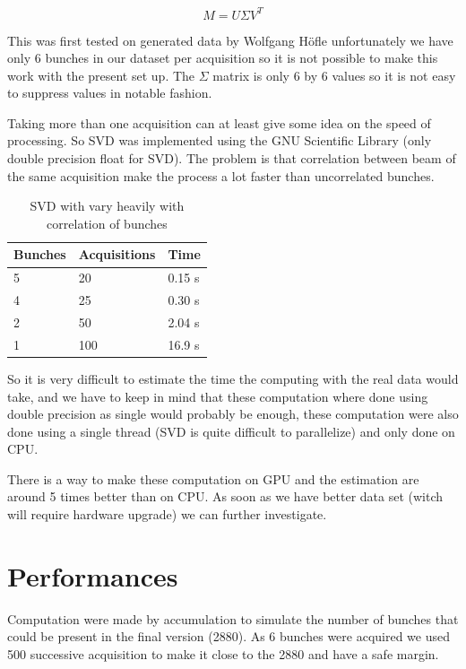 $$M = U \Sigma V^{T}$$ 

This was first tested on generated data by Wolfgang H{\"o}fle\cite{HofleEvian10} unfortunately we have only 6 bunches in our dataset per acquisition so it is not possible to make this work with the present set up. The $\Sigma$ matrix is only 6 by 6 values so it is not easy to suppress values in notable fashion.

Taking more than one acquisition can at least give some idea on the speed of processing. So SVD was implemented using the GNU Scientific Library (only double precision float for SVD). The problem is that correlation between beam of the same acquisition make the process a lot faster than uncorrelated bunches.

\begin{table}[H]
	\caption{SVD with vary heavily with correlation of bunches}
	\label{tab:SVD}
	\centering
	\begin{tabular}{|l|l|l|}
		\hline
			Bunches & Acquisitions & Time \\
		\hline
			5 & 20 & 0.15 s \\
			4 & 25 & 0.30 s \\
			2 & 50 & 2.04 s \\
			1 & 100 & 16.9 s \\
		\hline
	\end{tabular}
\end{table}

So it is very difficult to estimate the time the computing with the real data would take, and we have to keep in mind that these computation where done using double precision as single would probably be enough, these computation were also done using a single thread (SVD is quite difficult to parallelize) and only done on \gls{CPU}.

There is a way to make these computation on \gls{GPU}\cite{Lahabar09} and the estimation are around 5 times better than on \gls{CPU}. As soon as we have better data set (witch will require hardware upgrade) we can further investigate.

\section{Performances}
\label{sec:perf}

Computation were made by accumulation to simulate the number of bunches that could be present in the final version (2880). As 6 bunches were acquired we used 500 successive acquisition to make it close to the 2880 and have a safe margin.

